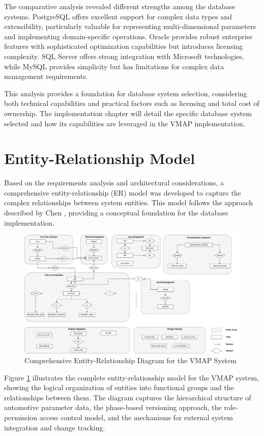 The comparative analysis revealed different strengths among the database systems. PostgreSQL offers excellent support for complex data types and extensibility, particularly valuable for representing multi-dimensional parameters and implementing domain-specific operations. Oracle provides robust enterprise features with sophisticated optimization capabilities but introduces licensing complexity. SQL Server offers strong integration with Microsoft technologies, while MySQL provides simplicity but has limitations for complex data management requirements.

This analysis provides a foundation for database system selection, considering both technical capabilities and practical factors such as licensing and total cost of ownership. The implementation chapter will detail the specific database system selected and how its capabilities are leveraged in the VMAP implementation.
\section{Entity-Relationship Model}
\label{sec:entity-relationship-model}

Based on the requirements analysis and architectural considerations, a comprehensive entity-relationship (ER) model was developed to capture the complex relationships between system entities. This model follows the approach described by Chen \cite{chen1976entity}, providing a conceptual foundation for the database implementation.

\begin{figure}[h]
\centering
\includegraphics[width=1.0\textwidth]{figures/vmap_er_diagram.png}
\caption{Comprehensive Entity-Relationship Diagram for the VMAP System}
\label{fig}
\end{figure}
Figure \ref{fig} illustrates the complete entity-relationship model for the VMAP system, showing the logical organization of entities into functional groups and the relationships between them. The diagram captures the hierarchical structure of automotive parameter data, the phase-based versioning approach, the role-permission access control model, and the mechanisms for external system integration and change tracking.

